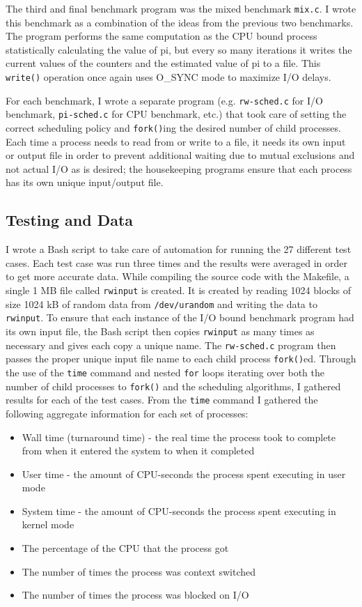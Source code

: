 The third and final benchmark program was the mixed benchmark  \texttt{mix.c}.  I wrote this benchmark as a combination of the ideas from the previous two benchmarks.  The program performs the same computation as the CPU bound process statistically calculating the value of pi, but every so many iterations it writes the current values of the counters and the estimated value of pi to a file.  This \texttt{write()} operation once again uses O\_SYNC mode to maximize I/O delays.

For each benchmark, I wrote a separate program (e.g. \texttt{rw-sched.c} for I/O benchmark, \texttt{pi-sched.c} for CPU benchmark\cite{sayler-pi-sched}, etc.) that took care of setting the correct scheduling policy and \texttt{fork()}ing the desired number of child processes.  Each time a process needs to read from or write to a file, it needs its own input or output file in order to prevent additional waiting due to mutual exclusions and not actual I/O as is desired; the housekeeping programs ensure that each process has its own unique input/output file.

\subsection{Testing and Data}

I wrote a Bash script to take care of automation for running the 27 different test cases.  Each test case was run three times and the results were averaged in order to get more accurate data.  While compiling the source code with the Makefile, a single 1 MB file called \texttt{rwinput} is created.  It is created by reading 1024 blocks of size 1024 kB of random data from \texttt{/dev/urandom} and writing the data to \texttt{rwinput}.  To ensure that each instance of the I/O bound benchmark program had its own input file, the Bash script then copies \texttt{rwinput} as many times as necessary and gives each copy a unique name.  The \texttt{rw-sched.c} program then passes the proper unique input file name to each child process \texttt{fork()}ed.  Through the use of the \texttt{time} command and nested \texttt{for} loops iterating over both the number of child processes to \texttt{fork()} and the scheduling algorithms, I gathered results for each of the test cases.  From the \texttt{time} command I gathered the following aggregate information for each set of processes:

\begin{itemize}
  \item Wall time (turnaround time) - the real time the process took to complete from when it entered the system to when it completed
  \item User time - the amount of CPU-seconds the process spent executing in user mode
  \item System time - the amount of CPU-seconds the process spent executing in kernel mode
  \item The percentage of the CPU that the process got
  \item The number of times the process was context switched
  \item The number of times the process was blocked on I/O
\end{itemize}


